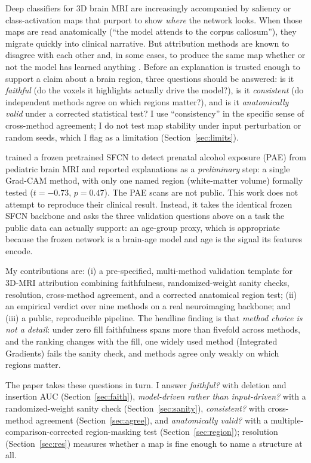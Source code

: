 \documentclass[11pt]{article}
\begin{document}
Deep classifiers for 3D brain MRI are increasingly accompanied by saliency or
class-activation maps that purport to show \emph{where} the network looks. When those maps
are read anatomically (``the model attends to the corpus callosum''), they migrate
quickly into clinical narrative. But attribution methods are known to disagree with each
other and, in some cases, to produce the same map whether or not the model has learned
anything \citep{adebayo2018}. Before an explanation is trusted enough to support a claim
about a brain region, three questions should be answered: is it \emph{faithful} (do the
voxels it highlights actually drive the model?), is it \emph{consistent} (do independent
methods agree on which regions matter?), and is it \emph{anatomically valid} under a corrected
statistical test? I use ``consistency'' in the specific sense of cross-method agreement; I
do not test map stability under input perturbation or random seeds, which I flag as a
limitation (Section~\ref{sec:limits}).

\citet{das2024} trained a frozen pretrained SFCN to detect prenatal alcohol exposure (PAE)
from pediatric brain MRI and reported explanations as a \emph{preliminary} step: a single
Grad-CAM method, with only one named region (white-matter volume) formally tested
($t=-0.73$, $p=0.47$). The PAE scans are not public. This work does not attempt to reproduce
their clinical result. Instead, it takes the identical frozen SFCN backbone and asks the
three validation questions above on a task the public data can actually support: an
age-group proxy, which is appropriate because the frozen network is a brain-age model and
age is the signal its features encode.

My contributions are: (i) a pre-specified, multi-method validation template for 3D-MRI
attribution combining faithfulness, randomized-weight sanity checks, resolution, cross-method
agreement, and a corrected anatomical region test; (ii) an empirical verdict over nine
methods on a real neuroimaging backbone; and (iii) a public, reproducible pipeline. The
headline finding is that \emph{method choice is not a detail}: under zero fill faithfulness spans more than fivefold across methods, and the ranking changes with the fill, one widely used method (Integrated Gradients) fails the sanity check,
and methods agree only weakly on which regions matter.

The paper takes these questions in turn. I answer \emph{faithful?} with deletion
and insertion AUC (Section~\ref{sec:faith}), \emph{model-driven rather than input-driven?}
with a randomized-weight sanity check (Section~\ref{sec:sanity}), \emph{consistent?} with
cross-method agreement (Section~\ref{sec:agree}), and \emph{anatomically valid?} with a
multiple-comparison-corrected region-masking test (Section~\ref{sec:region}); resolution
(Section~\ref{sec:res}) measures whether a map is fine enough to name a structure at all.
\end{document}
